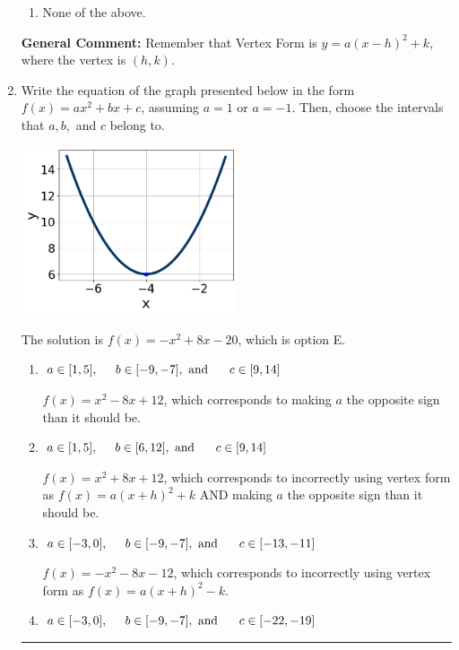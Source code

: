 \documentclass{extbook}[14pt]
\newcommand{\litem}[1]{\item #1

\rule{\textwidth}{0.4pt}}
\begin{document}
\begin{enumerate}
{\begin{enumerate}[label=\Alph*.]
\begin{multicols}{2}
\end{multicols}\item None of the above.\end{enumerate}
\textbf{General Comment:} Remember that Vertex Form is $y = a(x-h)^2+k$, where the vertex is $(h, k)$.
}
\litem{
Write the equation of the graph presented below in the form $f(x)=ax^2+bx+c$, assuming  $a=1$ or $a=-1$. Then, choose the intervals that $a, b,$ and $c$ belong to.

\begin{center}
    \includegraphics[width=0.5\textwidth]{../Figures/quadraticGraphToEquationC.png}
\end{center}


The solution is \( f(x) = -x^{2} +8 x -20 \), which is option E.\begin{enumerate}[label=\Alph*.]
\item \( a \in [1, 5], \hspace*{5mm} b \in [-9, -7], \text{ and } \hspace*{5mm} c \in [9, 14] \)

$f(x)=x^{2} -8 x + 12$, which corresponds to making $a$ the opposite sign than it should be.
\item \( a \in [1, 5], \hspace*{5mm} b \in [6, 12], \text{ and } \hspace*{5mm} c \in [9, 14] \)

$f(x)=x^{2} +8 x + 12$, which corresponds to incorrectly using vertex form as $f(x) = a(x+h)^2+k$ AND making $a$ the opposite sign than it should be.
\item \( a \in [-3, 0], \hspace*{5mm} b \in [-9, -7], \text{ and } \hspace*{5mm} c \in [-13, -11] \)

$f(x)=-x^{2} -8 x -12$, which corresponds to incorrectly using vertex form as $f(x) = a(x+h)^2 - k$.
\item \( a \in [-3, 0], \hspace*{5mm} b \in [-9, -7], \text{ and } \hspace*{5mm} c \in [-22, -19] \)


\end{enumerate}}
\end{enumerate}
\end{document}
